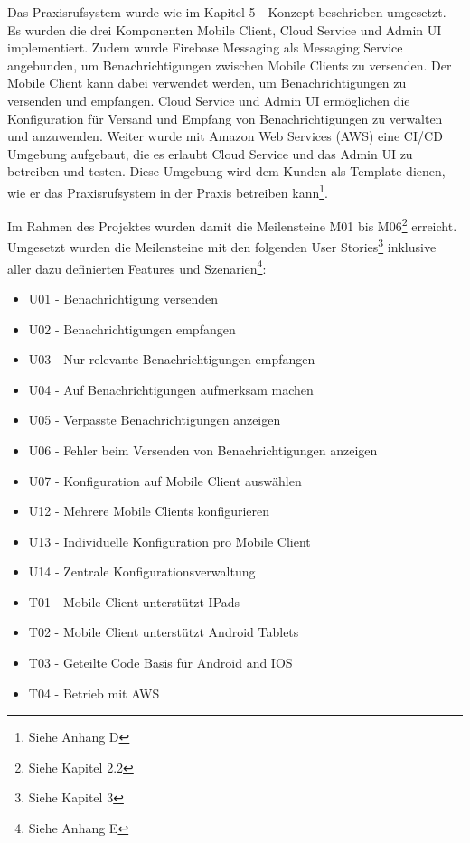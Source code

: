 Das Praxisrufsystem wurde wie im Kapitel 5 - Konzept beschrieben umgesetzt.
Es wurden die drei Komponenten Mobile Client, Cloud Service und Admin UI implementiert.
Zudem wurde Firebase Messaging als Messaging Service angebunden, um Benachrichtigungen zwischen Mobile Clients zu versenden.
Der Mobile Client kann dabei verwendet werden, um Benachrichtigungen zu versenden und empfangen.
Cloud Service und Admin UI ermöglichen die Konfiguration für Versand und Empfang von Benachrichtigungen zu verwalten und anzuwenden.
Weiter wurde mit Amazon Web Services (AWS) eine CI/CD Umgebung aufgebaut, die es erlaubt Cloud Service und das Admin UI zu betreiben und testen.
Diese Umgebung wird dem Kunden als Template dienen, wie er das Praxisrufsystem in der Praxis betreiben kann\footnote{Siehe Anhang D}.

Im Rahmen des Projektes wurden damit die Meilensteine M01 bis M06\footnote{Siehe Kapitel 2.2} erreicht.
Umgesetzt wurden die Meilensteine mit den folgenden User Stories\footnote{Siehe Kapitel 3} inklusive aller dazu definierten Features und Szenarien\footnote{Siehe Anhang E}:

\begin{itemize}
    \item U01 - Benachrichtigung versenden
    \item U02 - Benachrichtigungen empfangen
    \item U03 - Nur relevante Benachrichtigungen empfangen
    \item U04 - Auf Benachrichtigungen aufmerksam machen
    \item U05 - Verpasste Benachrichtigungen anzeigen
    \item U06 - Fehler beim Versenden von Benachrichtigungen anzeigen
    \item U07 - Konfiguration auf Mobile Client auswählen
    \item U12 - Mehrere Mobile Clients konfigurieren
    \item U13 - Individuelle Konfiguration pro Mobile Client
    \item U14 - Zentrale Konfigurationsverwaltung
    \item T01 - Mobile Client unterstützt IPads
    \item T02 - Mobile Client unterstützt Android Tablets
    \item T03 - Geteilte Code Basis für Android and IOS
    \item T04 - Betrieb mit AWS
\end{itemize}


